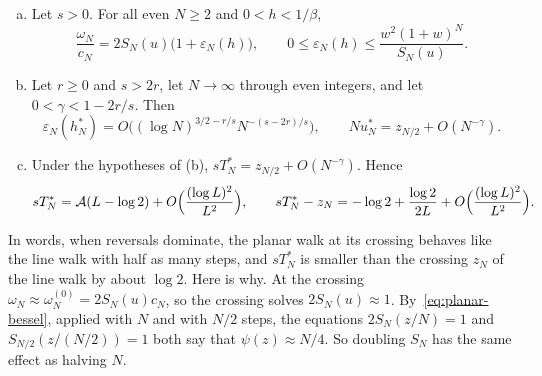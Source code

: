 \begin{theorem}\label{thm:planar-rev}
\begin{enumerate}[(a)]
\item Let $s>0$. For all even $N\ge2$ and $0<h<1/\beta$,
\[
 \frac{\omega_N}{c_N}=2S_N(u)\bigl(1+\varepsilon_N(h)\bigr),\qquad
 0\le\varepsilon_N(h)\le\frac{w^2(1+w)^N}{S_N(u)}.
\]
\item Let $r\ge0$ and $s>2r$, let $N\to\infty$ through even integers, and let
$0<\gamma<1-2r/s$. Then
\[
 \varepsilon_N(h^*_N)=O\bigl((\log N)^{3/2-r/s}N^{-(s-2r)/s}\bigr),\qquad
 Nu^*_N=z_{N/2}+O(N^{-\gamma}).
\]
\item Under the hypotheses of (b), $sT^*_N=z_{N/2}+O(N^{-\gamma})$. Hence
\[
 sT^*_N=\mathcal A(L-\log2)+O\Bigl(\frac{(\log L)^2}{L^2}\Bigr),\qquad
 sT^*_N-z_N=-\log2+\frac{\log2}{2L}+O\Bigl(\frac{(\log L)^2}{L^2}\Bigr).
\]
\end{enumerate}
\end{theorem}

In words, when reversals dominate, the planar walk at its crossing behaves like
the line walk with half as many steps, and $sT^*_N$ is smaller than the
crossing $z_N$ of the line walk by about $\log2$. Here is why. At the crossing $\omega_N\approx
\omega^{(0)}_N=2S_N(u)c_N$, so the crossing solves $2S_N(u)\approx1$.
By~\eqref{eq:planar-bessel}, applied with $N$ and with $N/2$ steps, the
equations $2S_N(z/N)=1$ and $S_{N/2}(z/(N/2))=1$ both say that
$\psi(z)\approx N/4$. So doubling $S_N$ has the same effect as halving $N$.

